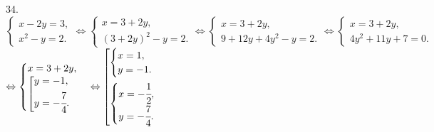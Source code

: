 34. $\begin{cases}
x-2y=3,\\
x^2-y=2.\end{cases}\Leftrightarrow\begin{cases}
x=3+2y,\\
(3+2y)^2-y=2.\end{cases}\Leftrightarrow\begin{cases}
x=3+2y,\\
9+12y+4y^2-y=2.\end{cases}\Leftrightarrow\begin{cases}
x=3+2y,\\
4y^2+11y+7=0.\end{cases}$\\$\Leftrightarrow\begin{cases}
x=3+2y,\\
\left[
      \begin{gathered} y=-1,\hfill\\
      y=-\cfrac{7}{4}.\hfill \end{gathered}\right.\end{cases}\Leftrightarrow
\left[
      \begin{gathered} \begin{cases}x=1,\\y=-1.\end{cases}\hfill\\
      \begin{cases}x=-\cfrac{1}{2},\\y=-\cfrac{7}{4}.\end{cases}\hfill \end{gathered}\right.$\\
